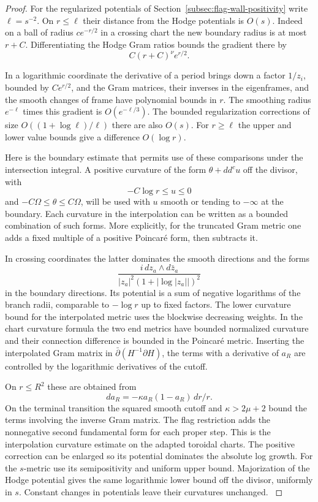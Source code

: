 \begin{proof}
For the regularized potentials of Section~\ref{subsec:flag-wall-positivity}
write \(\ell=s^{-2}\). On \(r\le\ell\) their distance from the
Hodge potentials is \(O(s)\). Indeed on a ball of radius
\(c e^{-r/2}\) in a crossing chart the new boundary radius is
at most \(r+C\). Differentiating the Hodge Gram ratios bounds
the gradient there by
\[
 C(r+C)^\nu e^{r/2}.
\]

In a logarithmic
coordinate the derivative of a period brings down a factor
\(1/z_i\), bounded by \(Ce^{r/2}\), and the Gram matrices,
their inverses in the eigenframes, and the smooth changes of
frame have polynomial bounds in \(r\). The smoothing radius
\(e^{-\ell}\) times this gradient is \(O(e^{-\ell/3})\).
The bounded regularization corrections of size
\(O((1+\log\ell)/\ell)\) there are also \(O(s)\).
For \(r\ge\ell\) the upper and lower value bounds give a
difference \(O(\log r)\). \label{cor:flag-wall-polynomial-2}

Here is the boundary estimate that permits use of these comparisons
under the intersection integral. A positive curvature of the form
\(\theta+dd^c u\) off the divisor, with
\[
 -C\log r\le u\le0
\]
and \(-C\Omega\le\theta\le C\Omega\),
will be used with \(u\) smooth or tending to \(-\infty\) at the
boundary. Each curvature in the interpolation can be written
as a bounded combination of such forms. More explicitly, for
the truncated Gram metric one adds a fixed multiple of a positive
Poincar\'e form, then subtracts it.

In crossing coordinates the
latter dominates the smooth directions and the forms
\[
 \frac{i\,dz_a\wedge d\bar z_a}
 {|z_a|^2(1+|\log |z_a||)^2}
\]
in the boundary directions. Its potential is a sum of negative
logarithms of the branch radii, comparable to \(-\log r\)
up to fixed factors. The lower curvature bound for the interpolated
metric uses the blockwise decreasing weights. In the chart curvature
formula the two end metrics have bounded normalized curvature
and their connection difference is bounded in the Poincar\'e
metric. Inserting the interpolated Gram matrix in
\(\bar\partial(H^{-1}\partial H)\), the terms with a derivative
of \(a_R\) are controlled by the logarithmic derivatives of the
cutoff.

On \(r\le R^2\) these are obtained from
\[
 da_R=-\kappa a_R(1-a_R)\,dr/r.
\]
On the terminal transition the
squared smooth cutoff and \(\kappa>2\mu+2\) bound the terms
involving the inverse Gram matrix. The flag restriction adds
the nonnegative second fundamental form for each proper step.
This is the interpolation curvature estimate on the adapted
toroidal charts. The positive correction can be enlarged so its
potential dominates the absolute log growth. For the \(s\)-metric
use its semipositivity and uniform upper bound. Majorization of the
Hodge potential gives the same logarithmic lower bound off the
divisor, uniformly in \(s\). Constant changes in potentials leave
their curvatures unchanged. \label{cor:flag-wall-polynomial-3}


\end{proof}

